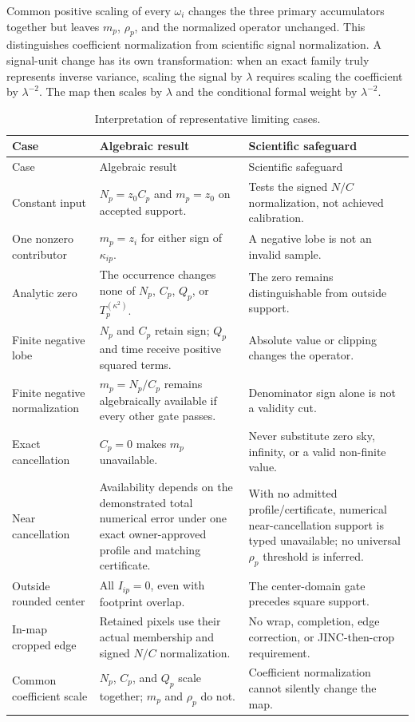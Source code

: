\documentclass[11pt]{article}
\begin{document}
Common positive scaling of every $\omega_i$ changes the three primary
accumulators together but leaves $m_p$, $\rho_p$, and the normalized operator
unchanged.  This distinguishes coefficient normalization from scientific
signal normalization.  A signal-unit change has its own transformation: when
an exact family truly represents inverse variance, scaling the signal by
$\lambda$ requires scaling the coefficient by $\lambda^{-2}$.  The map then
scales by $\lambda$ and the conditional formal weight by $\lambda^{-2}$.

\begin{longtable}{@{}>{\raggedright\arraybackslash}p{}
                        >{\raggedright\arraybackslash}p{}
                        >{\raggedright\arraybackslash}p{}@{}}
\caption{Interpretation of representative limiting cases.}\label{tab:limits}\\
\toprule
Case & Algebraic result & Scientific safeguard \\
\midrule
\endfirsthead
\toprule
Case & Algebraic result & Scientific safeguard \\
\midrule
\endhead
Constant input & $N_p=z_0C_p$ and $m_p=z_0$ on accepted support. & Tests the
signed $N/C$ normalization, not achieved calibration. \\
One nonzero contributor & $m_p=z_i$ for either sign of $\kappa_{ip}$. & A
negative lobe is not an invalid sample. \\
Analytic zero & The occurrence changes none of $N_p$, $C_p$, $Q_p$, or
$T_p^{(\kappa^2)}$. & The zero remains distinguishable from outside support. \\
Finite negative lobe & $N_p$ and $C_p$ retain sign; $Q_p$ and time receive
positive squared terms. & Absolute value or clipping changes the operator. \\
Finite negative normalization & $m_p=N_p/C_p$ remains algebraically available
if every other gate passes. & Denominator sign alone is not a validity cut. \\
Exact cancellation & $C_p=0$ makes $m_p$ unavailable. & Never substitute zero
sky, infinity, or a valid non-finite value. \\
Near cancellation & Availability depends on the demonstrated total numerical
error under one exact owner-approved profile and matching certificate. & With
no admitted profile/certificate, numerical near-cancellation support is typed
unavailable; no universal $\rho_p$ threshold is inferred. \\
Outside rounded center & All $I_{ip}=0$, even with footprint overlap. & The
center-domain gate precedes square support. \\
In-map cropped edge & Retained pixels use their actual membership and signed
$N/C$ normalization. & No wrap, completion, edge correction, or
JINC-then-crop requirement. \\
Common coefficient scale & $N_p$, $C_p$, and $Q_p$ scale together; $m_p$ and
$\rho_p$ do not. & Coefficient normalization cannot silently change the map. \\
\bottomrule
\end{longtable}
\end{document}
